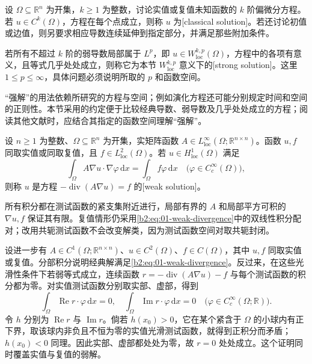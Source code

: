 \begin{definition}\label{b2:def:01-classical-strong}
设 \(\Omega\subseteq\mathbb R^n\) 为开集，\(k\geq1\) 为整数，讨论实值或复值未知函数的 \(k\) 阶偏微分方程。若 \(u\in C^k(\Omega)\)，方程在每个点成立，则称 \(u\) 为[classical solution]。若还讨论初值或边值，则另要求相应导数连续延伸到指定部分，并满足那些附加条件。

\ProseParagraphBreak

若所有不超过 \(k\) 阶的弱导数局部属于 \(L^p\)，即 \(u\in W^{k,p}_{\mathrm{loc}}(\Omega)\)，方程中的各项有意义，且等式几乎处处成立，则称它为本节 \(W^{k,p}_{\mathrm{loc}}\) 意义下的[strong solution]。这里 \(1\leq p\leq\infty\)，具体问题必须说明所取的 \(p\) 和函数空间。
\end{definition}

“强解”的用法依赖所研究的方程与空间；例如演化方程还可能分别规定时间和空间的正则性。本节采用的约定便于比较经典导数、弱导数及几乎处处成立的方程；阅读其他文献时，应结合其指定的函数空间理解“强解”。

\begin{definition}\label{b2:def:01-divergence-weak}
设 \(n\geq1\) 为整数、\(\Omega\subseteq\mathbb R^n\) 为开集，实矩阵函数 \(A\in L^\infty_{\mathrm{loc}}(\Omega;\mathbb R^{n\times n})\)。函数 \(u,f\) 同取实值或同取复值，且 \(f\in L^2_{\mathrm{loc}}(\Omega)\)。若 \(u\in H^1_{\mathrm{loc}}(\Omega)\) 满足
\begin{equation}\label{b2:eq:01-weak-divergence}
\int_\Omega A\nabla u\cdot\nabla\varphi\,\mathrm{d}x
=\int_\Omega f\varphi\,\mathrm{d}x
\quad\bigl(\varphi\in C_c^\infty(\Omega)\bigr),
\end{equation}
则称 \(u\) 是方程 \(-\operatorname{div}(A\nabla u)=f\) 的[weak solution]。
\end{definition}

所有积分都在测试函数的紧支集附近进行，局部有界的 \(A\) 和局部平方可积的 \(\nabla u,f\) 保证其有限。复值情形仍采用\eqref{b2:eq:01-weak-divergence}中的双线性积分配对；改用共轭测试函数不会改变解类，因为测试函数空间对取共轭封闭。

\ProseParagraphBreak

设进一步有 \(A\in C^1(\Omega;\mathbb R^{n\times n})\)、\(u\in C^2(\Omega)\)、\(f\in C(\Omega)\)，其中 \(u,f\) 同取实值或复值。分部积分说明经典解满足\eqref{b2:eq:01-weak-divergence}。反过来，在这些光滑性条件下若弱等式成立，连续函数 \(r=-\operatorname{div}(A\nabla u)-f\) 与每个测试函数的积分都为零。对实值测试函数分别取实部、虚部，得到
\[
 \int_\Omega\operatorname{Re}r\cdot\varphi\,\mathrm dx=0,
 \quad
 \int_\Omega\operatorname{Im}r\cdot\varphi\,\mathrm dx=0
 \quad\bigl(\varphi\in C_c^\infty(\Omega;\mathbb R)\bigr).
\]
令 \(h\) 分别为 \(\operatorname{Re}r\) 与 \(\operatorname{Im}r\)。倘若 \(h(x_0)>0\)，它在某个紧含于 \(\Omega\) 的小球内有正下界，取该球内非负且不恒为零的实值光滑测试函数，就得到正积分而矛盾；\(h(x_0)<0\) 同理。因此实部、虚部都处处为零，故 \(r=0\) 处处成立。这个证明同时覆盖实值与复值的弱解。

